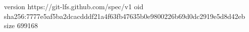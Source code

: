 version https://git-lfs.github.com/spec/v1
oid sha256:7777e5af5ba2dcacdddf21a4f63fb47635b0e9800226b69d0dc2919e5d8d42eb
size 699168
